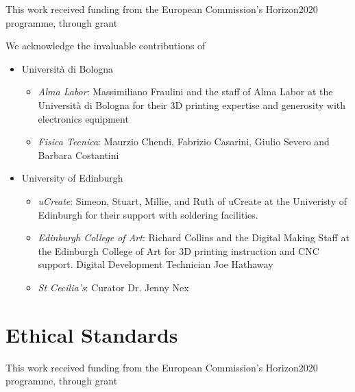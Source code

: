 \documentclass[sigconf]{nimeart}
\begin{document}

\begin{acks}
This work received funding from the European Commission's Horizon2020 programme, through grant 

 We acknowledge the invaluable contributions of
\begin{itemize}
\item
  Università di Bologna
  \begin{itemize}
  \item
    \emph{Alma Labor}:
      Massimiliano Fraulini and the staff of Alma Labor at the Università
      di Bologna for their 3D printing expertise and generosity with
      electronics equipment
  \item
    \emph{Fisica Tecnica}: Maurzio Chendi, Fabrizio Casarini, Giulio Severo and Barbara
      Costantini    
  \end{itemize}
\item
  University of Edinburgh
  \begin{itemize}
  \item
    \emph{uCreate}:    
      Simeon, Stuart, Millie, and Ruth of uCreate at the Univeristy of
      Edinburgh for their support with soldering facilities.    
  \item
    \emph{Edinburgh College of Art}: Richard Collins and the Digital Making Staff at the Edinburgh
      College of Art for 3D printing instruction and CNC support. Digital Development Technician Joe Hathaway    
    \item  
      \emph{St Cecilia's}: Curator Dr. Jenny Nex
  \end{itemize}
\end{itemize}

\end{acks}


\section{Ethical Standards}
This work received funding from the European Commission's Horizon2020 programme, through grant 



\end{document}
